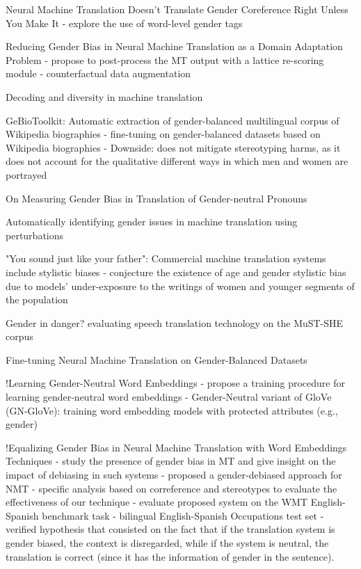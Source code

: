 Neural Machine Translation Doesn't Translate Gender Coreference Right Unless You Make It \parencite{Saunders_2020_coreference}
- explore the use of word-level gender tags

Reducing Gender Bias in Neural Machine Translation as a Domain Adaptation Problem \parencite{Saunders_2020}
- propose to post-process the MT output with a lattice re-scoring module
- counterfactual data augmentation
 
Decoding and diversity in machine translation \parencite{roberts2020decoding}

GeBioToolkit: Automatic extraction of gender-balanced multilingual corpus of Wikipedia biographies \parencite{costa2019gebiotoolkit}
- fine-tuning on gender-balanced datasets based on Wikipedia biographies
- Downside: does not mitigate stereotyping harms, as it does not account for the qualitative different ways in which men and women are portrayed

On Measuring Gender Bias in Translation of Gender-neutral Pronouns \parencite{Cho_2019}

Automatically identifying gender issues in machine translation using perturbations \parencite{Gonen_2020}

"You sound just like your father": Commercial machine translation systems include stylistic biases \parencite{Hovy_2020}
- conjecture the existence of age and gender stylistic bias due to models’ under-exposure to the writings of women and younger segments of the population

Gender in danger? evaluating speech translation technology on the MuST-SHE corpus \parencite{MuST-SHE}

Fine-tuning Neural Machine Translation on Gender-Balanced Datasets \parencite{costa2020fine}


!Learning Gender-Neutral Word Embeddings \parencite{Zhao_2018_GN-GloVe}
- propose a training procedure for learning gender-neutral word embeddings
- Gender-Neutral variant of GloVe (GN-GloVe): training word embedding models with protected attributes (e.g., gender)

!Equalizing Gender Bias in Neural Machine Translation
with Word Embeddings Techniques \parencite{Escud_Font_2019}
- study the presence of gender bias in MT and give insight on
the impact of debiasing in such systems
- proposed a gender-debiased approach for NMT
- specific analysis based on correference and stereotypes to evaluate the effectiveness of our technique
- evaluate proposed system on the WMT English-Spanish benchmark task
- bilingual English-Spanish Occupations test set
- verified hypothesis that consisted on the fact that if the translation system is gender biased, the context is disregarded, while if the system is neutral, the translation is correct (since it has the information of gender in the sentence).

